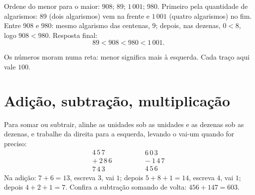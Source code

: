 \begin{example}\label{ex:g6:wholes:order}
Ordene do menor para o maior: $908$; $89$; $1\,001$; $980$. Primeiro pela
quantidade de algarismos: $89$ (dois algarismos) vem na frente e $1\,001$
(quatro algarismos) no fim. Entre $908$ e $980$: mesmo algarismo das
centenas, $9$; depois, nas dezenas, $0 < 8$, logo $908 < 980$. Resposta
final:
\[
89 < 908 < 980 < 1\,001 .
\]
\end{example}

\begin{omfigure}

{\small Os números moram numa reta: menor significa mais à esquerda. Cada
traço aqui vale $100$.}
\end{omfigure}

\section{Adição, subtração, multiplicação}

\begin{example}\label{ex:g6:wholes:columns}
Para somar ou subtrair, alinhe as unidades sob as unidades e as dezenas
sob as dezenas, e trabalhe da direita para a esquerda, levando o vai-um
quando for preciso:
\[
\begin{array}{r}
4\,5\,7 \\
+\ 2\,8\,6 \\
\hline
7\,4\,3
\end{array}
\qquad\qquad
\begin{array}{r}
6\,0\,3 \\
-\ 1\,4\,7 \\
\hline
4\,5\,6
\end{array}
\]
Na adição: $7 + 6 = 13$, escreva $3$, vai $1$; depois
$5 + 8 + 1 = 14$, escreva $4$, vai $1$; depois $4 + 2 + 1 = 7$. Confira a
subtração somando de volta: $456 + 147 = 603$.
\end{example}

